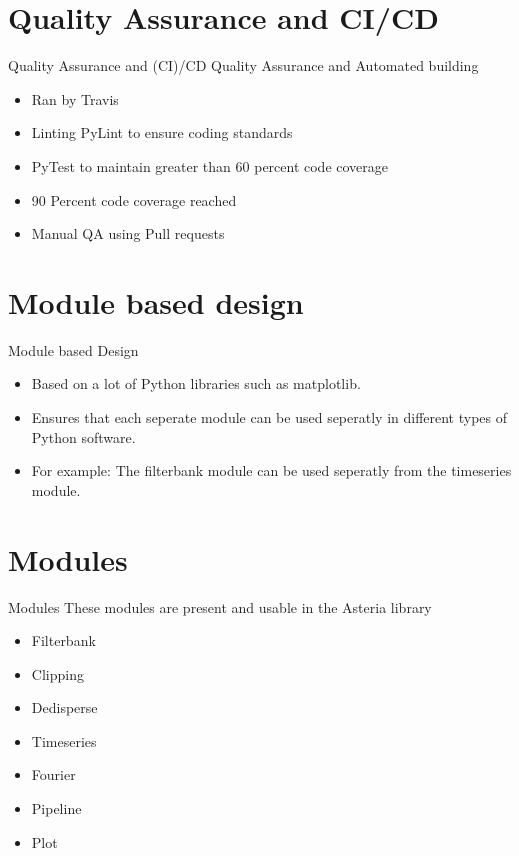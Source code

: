 \documentclass{beamer}
\begin{document}
\section{Quality Assurance and CI/CD}
\begin{frame}{Quality Assurance and (CI)/CD}
    Quality Assurance and Automated building    
	\begin{itemize}
		\item Ran by Travis
		\item Linting PyLint to ensure coding standards
		\item PyTest to maintain greater than 60 percent code coverage
		\item 90 Percent code coverage reached
		\item Manual QA using Pull requests
    \end{itemize}
\end{frame}

\section{Module based design}
\begin{frame}{Module based Design}
	\begin{itemize}
		\item Based on a lot of Python libraries such as matplotlib. 
		\item Ensures that each seperate module can be used seperatly in different types of Python software. 
		\item For example: The filterbank module can be used seperatly from the timeseries module. 
	\end{itemize}
\end{frame}


\section{Modules}
\begin{frame}{Modules}
	These modules are present and usable in the Asteria library     
	\begin{itemize}
		\item Filterbank
		\item Clipping
		\item Dedisperse
		\item Timeseries
		\item Fourier
		\item Pipeline
		\item Plot
	\end{itemize}
\end{frame}
\end{document}
